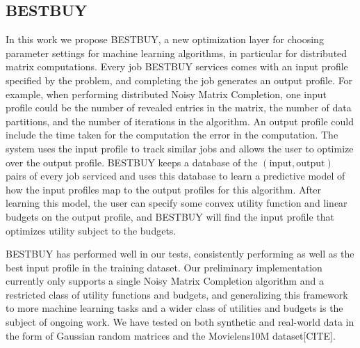 \subsection{BESTBUY}
In this work we propose BESTBUY, a new optimization layer for choosing parameter settings for machine learning algorithms, in particular for distributed matrix computations. Every job BESTBUY services comes with an input profile specified by the problem, and completing the job generates an output profile. For example, when performing distributed Noisy Matrix Completion, one input profile could be the number of revealed entries in the matrix, the number of data partitions, and the number of iterations in the algorithm. An output profile could include the time taken for the computation the error in the computation. The system uses the input profile to track similar jobs and allows the user to optimize over the output profile. BESTBUY keeps a database of the $(\text{input},\text{output})$ pairs of every job serviced and uses this database to learn a predictive model of how the input profiles map to the output profiles for this algorithm. After learning this model, the user can specify some convex utility function and linear budgets on the output profile, and BESTBUY will find the input profile that optimizes utility subject to the budgets. 

BESTBUY has performed well in our tests, consistently performing as well as the best input profile in the training dataset. Our preliminary implementation currently only supports a single Noisy Matrix Completion algorithm and a restricted class of utility functions and budgets, and generalizing this framework to more machine learning tasks and a wider class of utilities and budgets is the subject of ongoing work. We have tested on both synthetic and real-world data in the form of Gaussian random matrices and the Movielens10M dataset[CITE]. 

